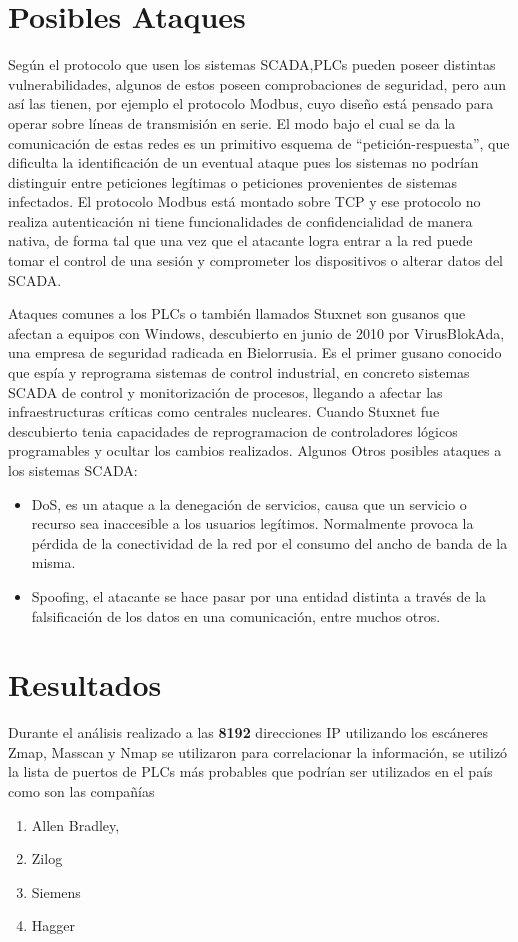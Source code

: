 \documentclass[jou,apacite]{apa6}
\begin{document}
\section{Posibles Ataques}
Según el protocolo que usen los sistemas SCADA,PLCs pueden poseer distintas vulnerabilidades, algunos de estos poseen comprobaciones de seguridad, pero aun así las tienen, por ejemplo el protocolo Modbus, cuyo diseño está pensado para operar sobre líneas de transmisión en serie. El modo bajo el cual se da la comunicación de estas redes es un primitivo esquema de “petición-respuesta”, que dificulta la identificación de un eventual ataque pues los sistemas no podrían distinguir entre peticiones legítimas o peticiones provenientes de sistemas infectados. El protocolo Modbus está montado sobre TCP y ese protocolo no realiza autenticación ni tiene funcionalidades de confidencialidad de manera nativa, de forma tal que una vez que el atacante logra entrar a la red puede tomar el control de una sesión y comprometer los dispositivos o alterar datos del SCADA.

Ataques comunes a los PLCs o también llamados Stuxnet son gusanos que afectan a equipos con Windows, descubierto en junio de 2010 por VirusBlokAda, una empresa de seguridad radicada en Bielorrusia. Es el primer gusano conocido que espía y reprograma sistemas de control industrial, en concreto sistemas SCADA de control y monitorización de procesos, llegando a afectar las infraestructuras críticas como centrales nucleares.
Cuando Stuxnet fue descubierto tenia capacidades de reprogramacion de controladores lógicos programables y ocultar los cambios realizados. 
Algunos Otros posibles ataques a los sistemas SCADA:
\begin{itemize}
\item DoS, es un ataque a la denegación de servicios, causa que un servicio o recurso sea inaccesible a los usuarios legítimos. Normalmente provoca la pérdida de la conectividad de la red por el consumo del ancho de banda de la misma.
\item Spoofing, el atacante se hace pasar por una entidad distinta a través de la falsificación de los datos en una comunicación, entre muchos otros.
\end{itemize}

\section{Resultados }
Durante el análisis realizado a las \textbf{8192} direcciones IP utilizando los escáneres Zmap, Masscan y Nmap se utilizaron para  correlacionar la información, se utilizó la lista de puertos de PLCs más probables que podrían ser utilizados en el país como son las compañías
\begin{enumerate}
\item Allen Bradley,
\item Zilog
\item Siemens
\item Hagger
\end{enumerate}
\end{document}
